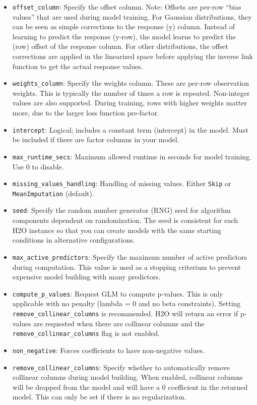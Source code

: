 \begin{itemize}
\item \texttt{offset\_column}: Specify the offset column. Note: Offsets are per-row “bias values” that are used during model training. For Gaussian distributions, they can be seen as simple corrections to the response (y) column. Instead of learning to predict the response (y-row), the model learns to predict the (row) offset of the response column. For other distributions, the offset corrections are applied in the linearized space before applying the inverse link function to get the actual response values. 
\item \texttt{weights\_column}: Specify the weights column. These are per-row observation weights. This is typically the number of times a row is repeated. Non-integer values are also supported. During training, rows with higher weights matter more, due to the larger loss function pre-factor.
\item \texttt{intercept}: Logical; includes a constant term (intercept) in the model. Must be included if there are factor columns in your model. %
\item \texttt{max\_runtime\_secs}: Maximum allowed runtime in seconds for model training. Use 0 to disable.
\item \texttt{missing\_values\_handling}: Handling of missing values. Either {\texttt{Skip}} or {\texttt{MeanImputation}} (default).
\item \texttt{seed}: Specify the random number generator (RNG) seed for algorithm components dependent on randomization. The seed is consistent for each H2O instance so that you can create models with the same starting conditions in alternative configurations.
\item \texttt{max\_active\_predictors}: Specify the maximum number of active predictors during computation. This value is used as a stopping criterium to prevent expensive model building with many predictors.
\item \texttt{compute\_p\_values}: Request GLM to compute p-values. This is only applicable with no penalty (lambda = 0 and no beta constraints). Setting \texttt{remove\_collinear\_columns} is recommended. H2O will return an error if p-values are requested when there are collinear columns and the \texttt{remove\_collinear\_columns} flag is not enabled.
\item \texttt{non\_negative}: Forces coefficients to have non-negative values.
\item \texttt{remove\_collinear\_columns}: Specify whether to automatically remove collinear columns during model building. When enabled, collinear columns will be dropped from the model and will have a 0 coefficient in the returned model. This can only be set if there is no regularization.

\end{itemize}
